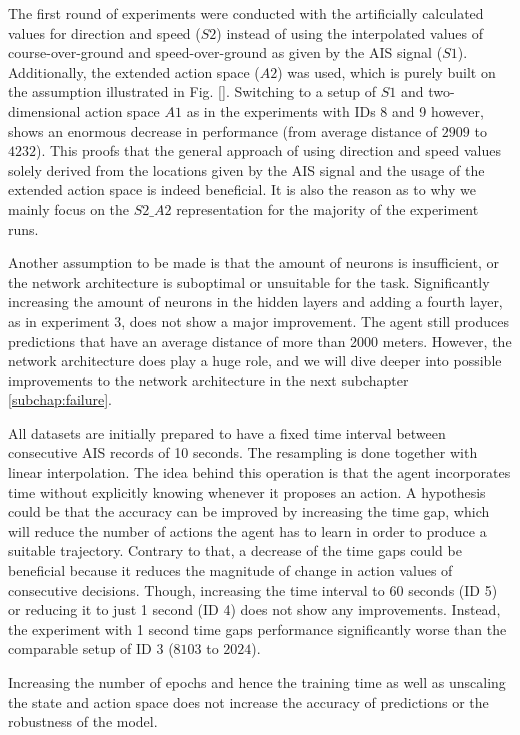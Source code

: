 The first round of experiments were conducted with the artificially calculated values for direction and speed ($S2$) instead of using the interpolated values of course-over-ground and speed-over-ground as given by the AIS signal ($S1$). Additionally, the extended action space ($A2$) was used, which is purely built on the assumption illustrated in Fig. \ref{}. Switching to a setup of $S1$ and two-dimensional action space $A1$ as in the experiments with IDs 8 and 9 however, shows an enormous decrease in performance (from average distance of $2909$ to $4232$). This proofs that the general approach of using direction and speed values solely derived from the locations given by the AIS signal and the usage of the extended action space is indeed beneficial. It is also the reason as to why we mainly focus on the $S2\_A2$ representation for the majority of the experiment runs.
\par
Another assumption to be made is that the amount of neurons is insufficient, or the network architecture is suboptimal or unsuitable for the task. Significantly increasing the amount of neurons in the hidden layers and adding a fourth layer, as in experiment 3, does not show a major improvement. The agent still produces predictions that have an average distance of more than 2000 meters. However, the network architecture does play a huge role, and we will dive deeper into possible improvements to the network architecture in the next subchapter \ref{subchap:failure}.
\par
All datasets are initially prepared to have a fixed time interval between consecutive AIS records of 10 seconds. The resampling is done together with linear interpolation. The idea behind this operation is that the agent incorporates time without explicitly knowing whenever it proposes an action. A hypothesis could be that the accuracy can be improved by increasing the time gap, which will reduce the number of actions the agent has to learn in order to produce a suitable trajectory. Contrary to that, a decrease of the time gaps could be beneficial because it reduces the magnitude of change in action values of consecutive decisions. Though, increasing the time interval to 60 seconds (ID 5) or reducing it to just 1 second (ID 4) does not show any improvements. Instead, the experiment with 1 second time gaps performance significantly worse than the comparable setup of ID 3 ($8103$ to $2024$).
\par
Increasing the number of epochs and hence the training time as well as unscaling the state and action space does not increase the accuracy of predictions or the robustness of the model.
